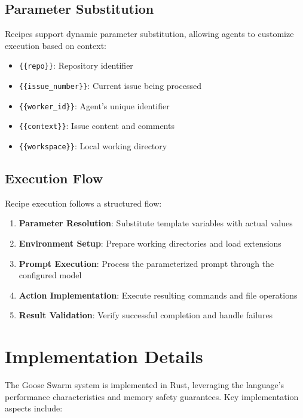 \documentclass[11pt,a4paper]{article}
\begin{document}
\subsection{Parameter Substitution}

Recipes support dynamic parameter substitution, allowing agents to customize execution based on context:

\begin{itemize}
    \item \texttt{\{\{repo\}\}}: Repository identifier
    \item \texttt{\{\{issue\_number\}\}}: Current issue being processed
    \item \texttt{\{\{worker\_id\}\}}: Agent's unique identifier
    \item \texttt{\{\{context\}\}}: Issue content and comments
    \item \texttt{\{\{workspace\}\}}: Local working directory
\end{itemize}

\subsection{Execution Flow}

Recipe execution follows a structured flow:

\begin{enumerate}
    \item \textbf{Parameter Resolution}: Substitute template variables with actual values
    \item \textbf{Environment Setup}: Prepare working directories and load extensions
    \item \textbf{Prompt Execution}: Process the parameterized prompt through the configured model
    \item \textbf{Action Implementation}: Execute resulting commands and file operations
    \item \textbf{Result Validation}: Verify successful completion and handle failures
\end{enumerate}

\section{Implementation Details}

The Goose Swarm system is implemented in Rust, leveraging the language's performance characteristics and memory safety guarantees. Key implementation aspects include:
\end{document}
